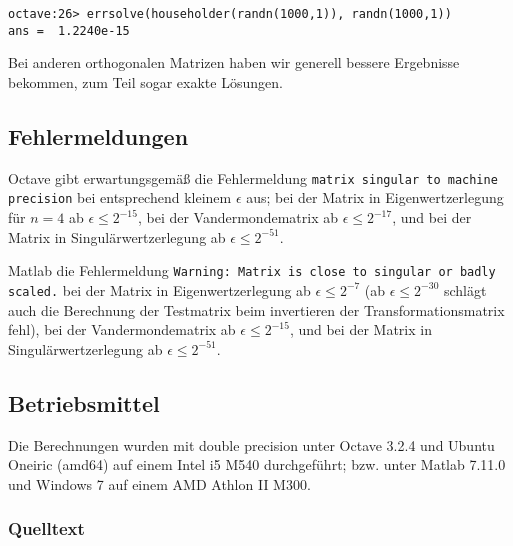 \documentclass{scrartcl}
\begin{document}
\begin{verbatim}
octave:26> errsolve(householder(randn(1000,1)), randn(1000,1))
ans =  1.2240e-15
\end{verbatim}

Bei anderen orthogonalen Matrizen haben wir generell bessere Ergebnisse
bekommen, zum Teil sogar exakte Lösungen.

\subsection{Fehlermeldungen}

Octave gibt erwartungsgemäß die Fehlermeldung \texttt{matrix singular to
machine precision} bei entsprechend kleinem \(\epsilon\) aus; bei der Matrix in
Eigenwertzerlegung für \(n=4\) ab \(\epsilon \leq 2^{-15}\), bei der Vandermondematrix ab
\(\epsilon \leq 2^{-17}\), und bei der Matrix in Singulärwertzerlegung ab
\(\epsilon \leq 2^{-51}\).

Matlab die Fehlermeldung \texttt{Warning: Matrix is close to singular or badly scaled.} bei der Matrix in Eigenwertzerlegung ab \(\epsilon
\leq 2^{-7}\) (ab \(\epsilon \leq 2^{-30}\) schlägt auch die Berechnung der
Testmatrix beim invertieren der Transformationsmatrix fehl), bei der Vandermondematrix ab \(\epsilon \leq 2^{-15}\), und
bei der Matrix in Singulärwertzerlegung ab \(\epsilon \leq 2^{-51}\).

\subsection{Betriebsmittel}

Die Berechnungen wurden mit double precision unter Octave 3.2.4 und Ubuntu
Oneiric (amd64) auf einem Intel i5 M540 durchgeführt; bzw. unter Matlab 7.11.0
und Windows 7 auf einem AMD Athlon II M300.

\subsubsection{Quelltext}













\end{document}
